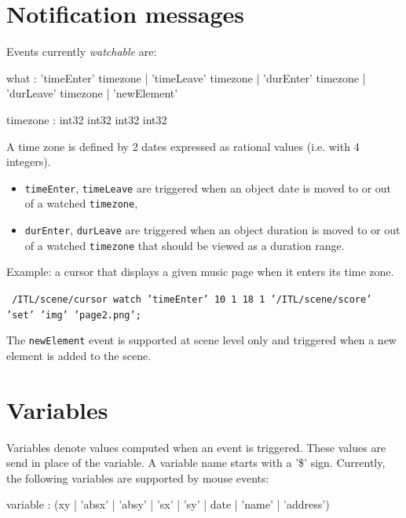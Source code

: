 \documentclass[a4paper,twoside]{report}
\newcommand{\sublevel}[1]	{\section{#1}}
\newcommand{\OSC}[1]		{\texttt{#1}}
\newcommand{\samplev}[1]			{\begin{center}\colorbox{mygrey}{
								\begin{minipage}[t]{\columnwidth} 
								{\small \texttt{#1}}
								\end{minipage}}\end{center}}
\begin{document}
\sublevel{Notification messages}
\label{notifymsg}

Events currently \emph{watchable} are:
\begin{rail}
what : 	'timeEnter' timezone | 'timeLeave' timezone 
		| 'durEnter' timezone | 'durLeave' timezone 
		| 'newElement'
\end{rail}

\begin{rail}
timezone : int32 int32 int32 int32
\end{rail}
A time zone is defined by 2 dates expressed as rational values (i.e. with 4 integers).

\begin{itemize}
\item \OSC{timeEnter}, \OSC{timeLeave} are triggered when an object date is moved to or out of a watched \OSC{timezone},
\item \OSC{durEnter}, \OSC{durLeave} are triggered when an object duration is moved to or out of a watched \OSC{timezone} that should be viewed as a duration range.
\end{itemize}

Example: a cursor that displays a given music page when it enters its time zone.
\samplev{
/ITL/scene/cursor watch 'timeEnter' 10 1 18 1 '/ITL/scene/score' 'set' 'img' 'page2.png';
}



The \OSC{newElement} event is supported at scene level only and triggered when a new element is added to the scene.


\sublevel{Variables}
\label{interactvar}

Variables denote values computed when an event is triggered. These values are send in place of the variable. A variable name starts with a '\$' sign. Currently, the following variables are supported by mouse events:
\begin{rail} 
variable : (xy | 'absx' | 'absy' | 'sx' | 'sy' | date | 'name' | 'address') 
\end{rail}
\end{document}
